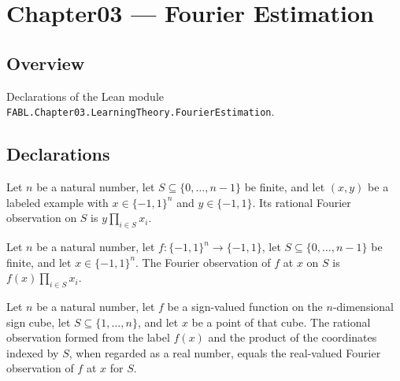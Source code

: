 \chapter{Chapter03 — Fourier Estimation}
\section{Overview}

Declarations of the Lean module \texttt{FABL.Chapter03.LearningTheory.FourierEstimation}.

\section{Declarations}

\begin{definition}
\label{FABL.rationalFourierObservation}
\leanok
{}
Let $n$ be a natural number, let $S\subseteq\{0,\ldots,n-1\}$ be finite, and let $(x,y)$
be a labeled example with $x\in\{−1,1\}^n$ and $y\in\{−1,1\}$. Its rational Fourier
observation on $S$ is $y\prod_{i\in S}x_i$.
\end{definition}

\begin{definition}
\label{FABL.fourierObservation}
\leanok
{}
Let $n$ be a natural number, let $f:\{−1,1\}^n\to\{−1,1\}$, let
$S\subseteq\{0,\ldots,n-1\}$ be finite, and let $x\in\{−1,1\}^n$. The Fourier
observation of $f$ at $x$ on $S$ is $f(x)\prod_{i\in S}x_i$.
\end{definition}

\begin{theorem}
\label{FABL.rationalFourierObservation_cast}
\leanok
{}
Let $n$ be a natural number, let $f$ be a sign-valued function on the $n$-dimensional
sign cube, let $S\subseteq\{1,\ldots,n\}$, and let $x$ be a point of that cube. The
rational observation formed from the label $f(x)$ and the product of the coordinates
indexed by $S$, when regarded as a real number, equals the real-valued Fourier
observation of $f$ at $x$ for $S$.
\end{theorem}

